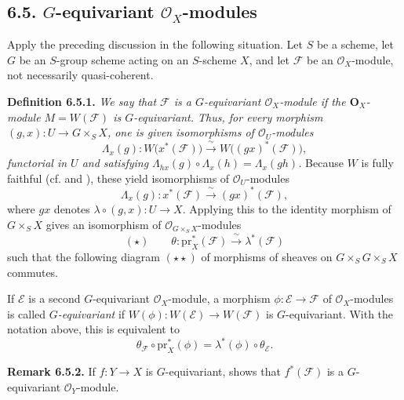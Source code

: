 \subsection*{6.5. \(G\)-equivariant \(\mathcal O_X\)-modules}

Apply the preceding discussion in the following situation. Let \(S\)
be a scheme, let \(G\) be an \(S\)-group scheme acting on an
\(S\)-scheme \(X\), and let \(\mathcal F\) be an
\(\mathcal O_X\)-module, not necessarily quasi-coherent.

\medskip
\noindent{}\textbf{Definition 6.5.1.}
\textit{We say that \(\mathcal F\) is a \(G\)-equivariant
\(\mathcal O_X\)-module if the \(\mathbf O_X\)-module
\(M=W(\mathcal F)\) is \(G\)-equivariant. Thus, for every morphism
\((g,x):U\to G\times_S X\), one is given isomorphisms of
\(\mathcal O_U\)-modules}
\[
  \Lambda_x(g):
  W\bigl(x^*(\mathcal F)\bigr)
  \xrightarrow{\ \sim\ }
  W\bigl((gx)^*(\mathcal F)\bigr),
\]
\textit{functorial in \(U\) and satisfying
\(\Lambda_{hx}(g)\circ\Lambda_x(h)=\Lambda_x(gh)\).}
Because \(W\) is fully faithful (cf.  and ), these yield
isomorphisms of \(\mathcal O_U\)-modules
\[
  \Lambda_x(g):x^*(\mathcal F)
  \xrightarrow{\ \sim\ }(gx)^*(\mathcal F),
\]
where \(gx\) denotes \(\lambda\circ(g,x):U\to X\). Applying this to
the identity morphism of \(G\times_S X\) gives an isomorphism of
\(\mathcal O_{G\times_S X}\)-modules
\[
  (\star)\qquad
  \theta:\mathrm{pr}_X^*(\mathcal F)
  \xrightarrow{\ \sim\ }\lambda^*(\mathcal F)
\]
such that the following diagram \((\star\star)\) of morphisms of
sheaves on \(G\times_SG\times_SX\) commutes.

\begin{figure}[H]
  \centering
  
  \label{fig:sga3-exp1-p043-sheaf-cocycle}
\end{figure}

If \(\mathcal E\) is a second \(G\)-equivariant
\(\mathcal O_X\)-module, a morphism
\(\phi:\mathcal E\to\mathcal F\) of \(\mathcal O_X\)-modules is called
\emph{\(G\)-equivariant} if \(W(\phi):W(\mathcal E)\to W(\mathcal F)\)
is \(G\)-equivariant. With the notation above, this is equivalent to
\[
  \theta_{\mathcal F}\circ\mathrm{pr}_X^*(\phi)
  =\lambda^*(\phi)\circ\theta_{\mathcal E}.
\]

\medskip
\noindent{}\textbf{Remark 6.5.2.}
If \(f:Y\to X\) is \(G\)-equivariant,  shows that
\(f^*(\mathcal F)\) is a \(G\)-equivariant
\(\mathcal O_Y\)-module.

